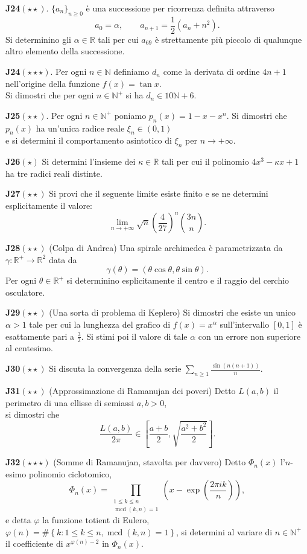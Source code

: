 \documentclass[a4paper,twoside]{article}
\renewcommand{\gcd}{\operatorname{mcd}}
\theoremstyle{definition}
\numberwithin{theorem}{section}
\begin{document}
\textbf{J24}$(\star\star)$. $\{a_n\}_{n\geq 0}$ è una successione per ricorrenza definita attraverso
$$ a_0=\alpha,\qquad a_{n+1} = \frac{1}{2}\left(a_n+n^2\right).$$
Si determinino gli $\alpha\in\mathbb{R}$ tali per cui $a_{69}$ è strettamente più piccolo di qualunque altro elemento della successione. 

\textbf{J24}$(\star\star\star)$. Per ogni $n\in\mathbb{N}$ definiamo $d_n$ come la derivata di ordine $4n+1$ nell'origine della funzione $f(x)=\tan x$.\\ Si dimostri che per ogni $n\in\mathbb{N}^+$ si ha $d_n \in 10\mathbb{N}+6$.

\textbf{J25}$(\star\star)$. Per ogni $n\in\mathbb{N}^+$ poniamo $p_n(x)=1-x-x^n$. Si dimostri che $p_n(x)$ ha un'unica radice reale $\xi_n\in (0,1)$\\ e si determini il comportamento asintotico di $\xi_n$ per $n\to +\infty$. 

\textbf{J26}$(\star)$ Si determini l'insieme dei $\kappa\in\mathbb{R}$ tali per cui il polinomio $4x^3-\kappa x+1$ ha tre radici reali distinte.

\textbf{J27}$(\star\star)$ Si provi che il seguente limite esiste finito e se ne determini esplicitamente il valore:
$$ \lim_{n\to +\infty} \sqrt{n}\left(\frac{4}{27}\right)^n \binom{3n}{n}. $$

\textbf{J28}$(\star\star)$ (Colpa di Andrea) Una spirale archimedea è parametrizzata da $\gamma:\mathbb{R}^+\to\mathbb{R}^2$ data da
$$ \gamma(\theta) = \left(\theta\cos\theta,\theta\sin\theta\right). $$
Per ogni $\theta\in\mathbb{R}^+$ si determinino esplicitamente il centro e il raggio del cerchio osculatore.

\textbf{J29}$(\star\star)$ (Una sorta di problema di Keplero) Si dimostri che esiste un unico $\alpha > 1$ tale per cui la lunghezza del grafico di $f(x)=x^{\alpha}$ sull'intervallo $[0,1]$ è esattamente pari a $\frac{3}{2}$. Si stimi poi il valore di tale $\alpha$ con un errore non superiore al centesimo.

\textbf{J30}$(\star\star)$ Si discuta la convergenza della serie $\sum_{n\geq 1}\frac{\sin(n(n+1))}{n}$. 

\textbf{J31}$(\star\star)$ (Approssimazione di Ramanujan dei poveri) Detto $L(a,b)$ il perimetro di una ellisse di semiassi $a,b > 0$,\\ si dimostri che 
$$ \frac{L(a,b)}{2\pi}\in\left[\frac{a+b}{2},\sqrt{\frac{a^2+b^2}{2}}\right]. $$

\textbf{J32}$(\star\star\star)$ (Somme di Ramanujan, stavolta per davvero) Detto $\Phi_n(x)$ l'$n$-esimo polinomio ciclotomico, 
$$\Phi_n(x) = \prod_{\substack{1\leq k\leq n\\\gcd(k,n)=1}}\left(x-\exp\left(\frac{2\pi i k}{n}\right)\right),$$ e detta $\varphi$ la funzione totient di Eulero, $\varphi(n)=\#\left\{k:1\leq k\leq n, \gcd(k,n)=1\right\}$, si determini al variare di $n\in\mathbb{N}^+$\\ il coefficiente di $x^{\varphi(n)-2}$ in $\Phi_n(x)$.
\end{document}
